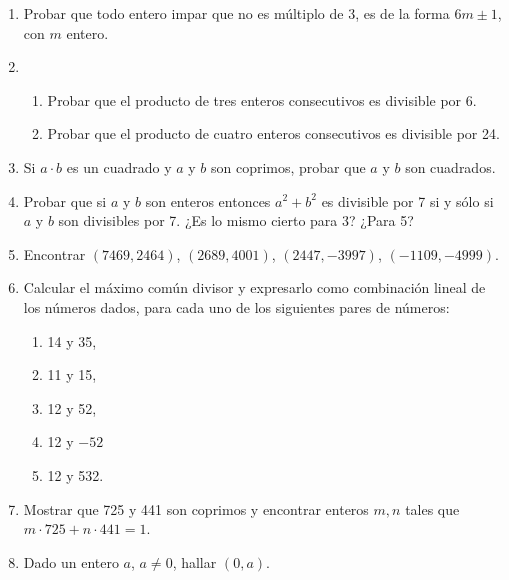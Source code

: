 \documentclass[12pt,spanish,makeidx]{amsbook}
\begin{document}
\begin{enumerate}
\smallskip
\item Probar que todo entero impar que no es m\'ultiplo de 3, es de la forma $6m\pm 1$, con $m$ entero.

\smallskip

\item 
\begin{enumerate}
 \item Probar que el producto de tres enteros consecutivos es divisible por 6.
 \item Probar que el producto de cuatro enteros consecutivos es divisible por 24.
\end{enumerate}

\smallskip

\item Si $a\cdot b$ es un cuadrado y $a$ y $b$ son coprimos, probar que $a$ y $b$ son cuadrados.

\smallskip

\smallskip
\item Probar que si $a$ y $b$ son enteros entonces $a^2+b^2$ es divisible por 7 si y s\'olo si $a$ y $b$ son divisibles por 7.
¿Es lo mismo cierto para 3? ¿Para 5?

\smallskip


\item Encontrar $(7469,2464)$, $(2689,4001)$, $(2447,-3997)$, $(-1109,-4999)$.

\smallskip

\item
Calcular el m\'aximo com\'un divisor y expresarlo como combinaci\'on lineal de los
n\'umeros dados, para cada uno de  los siguientes pares de n\'umeros:
\begin{multicols}{3}
\begin{enumerate}
  \item  14 y 35, 
	\item 11 y 15, 
	\item 12 y 52,
  \item 12 y $-52$  
	\item 12 y 532.
\end{enumerate}
\end{multicols}

\smallskip

\item Mostrar que 725 y 441 son coprimos y encontrar enteros $m,n$ tales que $ m\cdot 725+ n\cdot 441= 1$.


\item Dado un entero $a$, $a\neq 0$, hallar $(0,a)$.


\end{enumerate}
\end{document}
